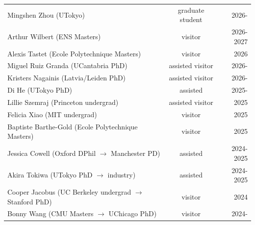 \begin{tabularx}{\linewidth}{Xcr}
Mingshen Zhou (UTokyo) & graduate student & 2026- \\
Arthur Wilbert (ENS Masters) & visitor & 2026-2027 \\
Alexis Tastet (Ecole Polytechnique Masters) & visitor & 2026 \\
Miguel Ruiz Granda (UCantabria PhD) & assisted visitor & 2026- \\
Kristers Nagainis (Latvia/Leiden PhD) & assisted visitor & 2026- \\
Di He (UTokyo PhD) & assisted & 2025- \\
Lillie Szemraj (Princeton undergrad) & assisted visitor & 2025 \\
Felicia Xiao (MIT undergrad) & visitor & 2025 \\
Baptiste Barthe-Gold (Ecole Polytechnique Masters) & visitor & 2025 \\
Jessica Cowell (Oxford DPhil $\rightarrow$ Manchester PD) & assisted & 2024-2025 \\
Akira Tokiwa (UTokyo PhD $\rightarrow$ industry) & assisted & 2024-2025 \\
Cooper Jacobus (UC Berkeley undergrad $\rightarrow$ Stanford PhD) & visitor & 2024 \\
Bonny Wang (CMU Masters $\rightarrow$ UChicago PhD) & visitor & 2024- \\
\end{tabularx}
